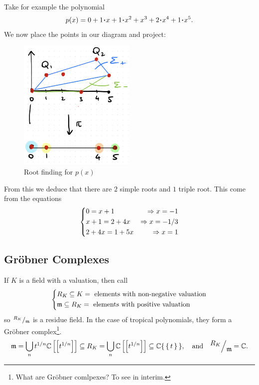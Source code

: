 \documentclass[12pt]{memoir}
\begin{document}
\begin{Ex}
    Take for example the polynomial 
    $$p(x)=0+1\.x+1\.x^2+x^3+2\.x^4+1\.x^5.$$
    We now place the points in our diagram and project:
    \begin{figure}[h!]
        \centering
        \includegraphics[width=0.5\textwidth]{figs/fig6-2CombinatorializationExample.png}
        \caption{Root finding for $p(x)$}
        \label{fig:6.2-CombinatorializationExample}
    \end{figure}
    From this we deduce that there are $2$ simple roots and $1$ triple root. This come from the equations
    $$
    \left\lbrace
    \begin{aligned}
        &0=x+1&\Rightarrow x=-1\\
        &x+1=2+4x&\Rightarrow x=-1/3\\
        &2+4x=1+5x&\Rightarrow x=1
    \end{aligned}
    \right.
    $$
\end{Ex}

\subsection{Gr\"obner Complexes}

If $K$ is a field with a valuation, then call
$$
\left\lbrace
\begin{aligned}
    &R_K\subseteq K=\text{ elements with non-negative valuation}\\
    &\mathfrak{m}\subseteq R_K=\text{ elements with positive valuation}
\end{aligned}
\right.
$$
so $\quot{R_K}{\lie{m}}$ is a residue field. In the case of tropical polynomials, they form a Gr\"obner complex\footnote{What are Gr\"obner comlpexes? To see in interim.}.
$$\lie{m}=\bigcup_nt^{1/n}\bC\bonj{\bonj{t^{1/n}}}\subseteq R_K=\bigcup_n\bC\bonj{\bonj{t^{1/n}}}\subseteq\bC\set{\set{t}},\word{and}\quot{R_K}{\lie{m}}=\bC.$$
\end{document}

